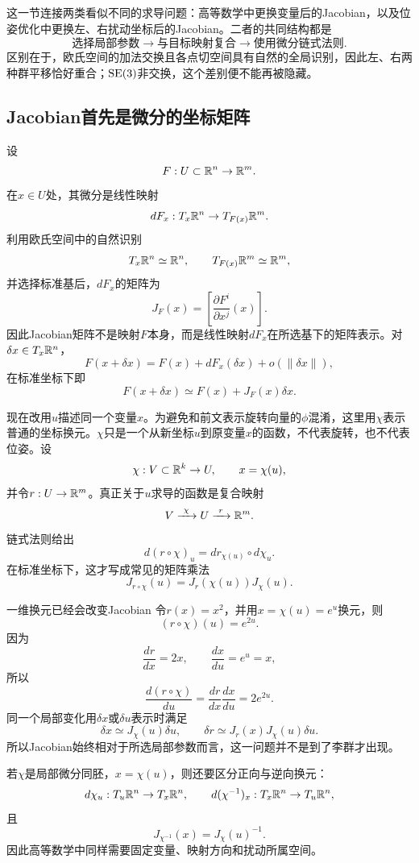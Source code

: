 这一节连接两类看似不同的求导问题：高等数学中更换变量后的Jacobian，以及位姿优化中更换左、右扰动坐标后的Jacobian。二者的共同结构都是
\[
    \text{选择局部参数}
    \longrightarrow
    \text{与目标映射复合}
    \longrightarrow
    \text{使用微分链式法则}.
\]
区别在于，欧氏空间的加法交换且各点切空间具有自然的全局识别，因此左、右两种群平移恰好重合；$\operatorname{SE}(3)$非交换，这个差别便不能再被隐藏。

\subsection{Jacobian首先是微分的坐标矩阵}

设
\[
    F:U\subset\mathbb{R}^n\to\mathbb{R}^m.
\]
在$x\in U$处，其微分是线性映射
\[
    dF_x:T_x\mathbb{R}^n\to T_{F(x)}\mathbb{R}^m.
\]
利用欧氏空间中的自然识别
\[
    T_x\mathbb{R}^n\simeq\mathbb{R}^n,
    \qquad
    T_{F(x)}\mathbb{R}^m\simeq\mathbb{R}^m,
\]
并选择标准基后，$dF_x$的矩阵为
\[
    J_F(x)
    =\left[
    \frac{\partial F^i}{\partial x^j}(x)
    \right].
\]
因此Jacobian矩阵不是映射$F$本身，而是线性映射$dF_x$在所选基下的矩阵表示。对$\delta x\in T_x\mathbb{R}^n$，
\[
    F(x+\delta x)
    =F(x)+dF_x(\delta x)+o(\|\delta x\|),
\]
在标准坐标下即
\[
    F(x+\delta x)
    \simeq F(x)+J_F(x)\delta x.
\]

现在改用$u$描述同一个变量$x$。为避免和前文表示旋转向量的$\phi$混淆，这里用$\chi$表示普通的坐标换元。$\chi$只是一个从新坐标$u$到原变量$x$的函数，不代表旋转，也不代表位姿。设
\[
    \chi:V\subset\mathbb{R}^k\to U,
    \qquad
    x=\chi(u),
\]
并令$r:U\to\mathbb{R}^m$。真正关于$u$求导的函数是复合映射
\[
    V\xrightarrow{\ \chi\ }U\xrightarrow{\ r\ }\R^m.
\]
链式法则给出
\[
    \boxed{
    d(r\circ\chi)_u
    =dr_{\chi(u)}\circ d\chi_u.
    }
\]
在标准坐标下，这才写成常见的矩阵乘法
\[
    \boxed{
    J_{r\circ\chi}(u)
    =J_r(\chi(u))J_\chi(u).
    }
\]

\begin{lieexample}{一维换元已经会改变Jacobian}
令$r(x)=x^2$，并用$x=\chi(u)=e^u$换元，则
\[
    (r\circ\chi)(u)=e^{2u}.
\]
因为
\[
    \frac{dr}{dx}=2x,
    \qquad
    \frac{dx}{du}=e^u=x,
\]
所以
\[
    \frac{d(r\circ\chi)}{du}
    =\frac{dr}{dx}\frac{dx}{du}
    =2e^{2u}.
\]
同一个局部变化用$\delta x$或$\delta u$表示时满足
\[
    \delta x\simeq J_\chi(u)\delta u,
    \qquad
    \delta r\simeq J_r(x)J_\chi(u)\delta u.
\]
所以Jacobian始终相对于所选局部参数而言，这一问题并不是到了李群才出现。
\end{lieexample}

若$\chi$是局部微分同胚，$x=\chi(u)$，则还要区分正向与逆向换元：
\[
    d\chi_u:T_u\mathbb{R}^n\to T_x\mathbb{R}^n,
    \qquad
    d(\chi^{-1})_x:T_x\mathbb{R}^n\to T_u\mathbb{R}^n,
\]
且
\[
    J_{\chi^{-1}}(x)=J_\chi(u)^{-1}.
\]
因此高等数学中同样需要固定变量、映射方向和扰动所属空间。

